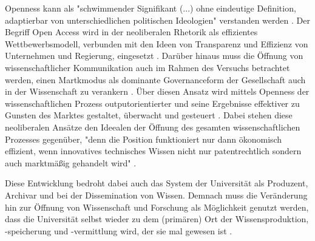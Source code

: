 Openness kann als "schwimmender Signifikant (...) ohne eindeutige Definition, adaptierbar von unterschiedlichen politischen Ideologien" verstanden werden \cite{Adema_2014_open_access}. Der Begriff Open Access wird in der neoliberalen Rhetorik als effizientes Wettbewerbsmodell, verbunden mit den Ideen von Transparenz und Effizienz von Unternehmen und Regierung, eingesetzt \cite{tkacz_2012_open}. Darüber hinaus muss die Öffnung von wissenschaftlicher Kommunikation auch im Rahmen des Versuchs betrachtet werden, einen Martkmodus als dominante Governanceform der Gesellschaft auch in der Wissenschaft zu verankern \cite[:152]{troy_2012_wissen}. Über diesen Ansatz wird mittels Openness der wissenschaftlichen Prozess outputorientierter und seine Ergebnisse effektiver zu Gunsten des Marktes gestaltet, überwacht und gesteuert \cite{adema_2010_oaoverview}. Dabei stehen diese neoliberalen Ansätze den Ideealen der Öffnung des gesamten wissenschaftlichen Prozesses gegenüber, "denn die Position funktioniert nur dann ökonomisch effizient, wenn innovatives technisches Wissen nicht nur patentrechtlich sondern auch marktmäßig gehandelt wird" \cite[:179]{troy_2012_wissen}.

Diese Entwicklung bedroht dabei auch das System der Universität als Produzent, Archivar und bei der Dissemination von Wissen. Demnach muss die Veränderung hin zur Öffnung von Wissenschaft und Forschung als Möglichkeit genutzt werden, dass die Universität selbst wieder zu dem (primären) Ort der Wissensproduktion, -speicherung und -vermittlung wird, der sie mal gewesen ist \cite{kittler_2004}.

